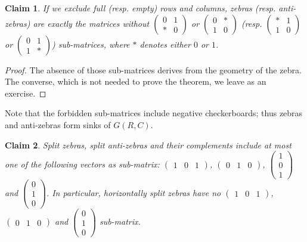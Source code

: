 \documentclass{article}
\newtheorem{claim}{Claim}
\begin{document}
\begin{claim}\label{geometry}
If we exclude full (resp. empty) rows and columns, zebras (resp. anti-zebras) are exactly the matrices without $\begin{pmatrix}
0&1\\
*&0
\end{pmatrix}$ or
$\begin{pmatrix}
0&*\\
1&0
\end{pmatrix}$ (resp.  $\begin{pmatrix}
*&1\\
1&0
\end{pmatrix}$ or
$\begin{pmatrix}
0&1\\
1&*
\end{pmatrix}$) sub-matrices, where $*$ denotes either $0$ or $1$.
\end{claim}

\begin{proof}
    The absence of those sub-matrices derives from the geometry of the zebra. The converse, which is not needed to prove the theorem, we leave as an exercise.
\end{proof}

Note that the forbidden sub-matrices include negative checkerboards; thus zebras and anti-zebras form sinks of $G(R,C)$.

\begin{claim}\label{no sub}
Split zebras, split anti-zebras and their complements include at most one of the following vectors as sub-matrix: $\begin{pmatrix}
1&0&1
\end{pmatrix}$, $\begin{pmatrix}
0&1&0
\end{pmatrix}$,
$\begin{pmatrix}
1\\
0\\
1
\end{pmatrix}$ and $\begin{pmatrix}
0\\
1\\
0
\end{pmatrix}$. In particular, horizontally split zebras have no $\begin{pmatrix}
1&0&1
\end{pmatrix}$, $\begin{pmatrix}
0&1&0
\end{pmatrix}$ and $\begin{pmatrix}
0\\
1\\
0
\end{pmatrix}$ sub-matrix. 
\end{claim}
\end{document}
